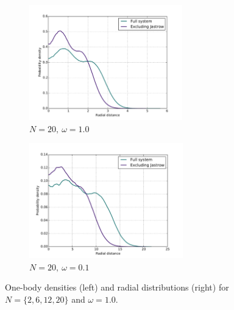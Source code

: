 \documentclass[english, a4paper]{article}
\begin{document}
\begin{figure}[H]
		\vspace{1mm}
		
		\begin{subfigure}{0.5\textwidth}
			\includegraphics[width=\textwidth, height= 5cm]{figures/radialDistribution/OneBodyDensityN20w100Se8.pdf}
			\caption{$N=20,\:\omega=1.0$}
		\end{subfigure}
		\begin{subfigure}{0.5\textwidth}
			\includegraphics[width=\textwidth, height= 5cm]{figures/radialDistribution/OneBodyDensityN20w10Se8.pdf}
			\caption{$N=20,\:\omega=0.1$}
		\end{subfigure}
				
		\vspace{3mm}
				
		\caption{One-body densities (left) and radial distributions (right) for $N=\{2,6,12,20\}$ and $\omega = 1.0$.}
		\label{fig:Onebody}
	\end{figure}
	
	\newpage
\end{document}
